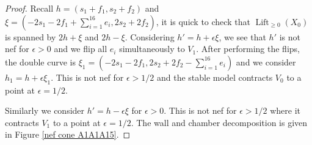 \documentclass[a4paper]{amsart}
\theoremstyle{definition}
\theoremstyle{plain}
\theoremstyle{remark}
\begin{document}
\begin{proof}
Recall $h=(s_1+f_1,s_2+f_2)$ and $\xi = (-2s_1-2f_1+\sum_{i=1}^{16}e_i,2s_2+2f_2)$, it is quick to check that $\operatorname{Lift}_{\geq 0}(X_0)$ is spanned by $2h+\xi$ and $2h-\xi$. Considering $h'=h+\epsilon\xi$, we see that $h'$ is not nef for $\epsilon > 0 $ and we flip all $e_i$ simultaneously to $V_1$. After performing the flips, the double curve is $\xi_1=(-2s_1-2f_1,2s_2+2f_2-\sum_{i=1}^{16}e_i)$ and we consider $h_1=h+\epsilon\xi_1$. This is not nef for $\epsilon > 1/2$ and the stable model contracts $V_0$ to a point at $\epsilon =1/2$.

Similarly we consider $h'=h-\epsilon\xi$ for $\epsilon > 0$. This is not nef for $\epsilon > 1/2$ where it contracts $V_1$ to a point at $\epsilon = 1/2$. The wall and chamber decomposition is given in Figure \ref{nef cone A1A1A15}.
\end{proof}
\end{document}
